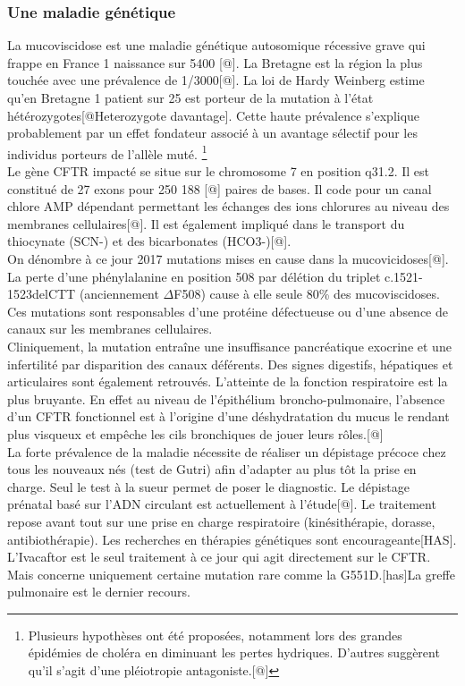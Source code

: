 \documentclass[12pt,a4paper]{article}
\begin{document}
\subsubsection{Une maladie génétique}
La mucoviscidose est une maladie génétique autosomique récessive grave qui frappe en France 1 naissance sur 5400 [@]. La Bretagne est la région la plus touchée avec une prévalence de 1/3000[@].
La loi de Hardy Weinberg estime qu’en Bretagne 1 patient sur 25 est porteur de la mutation à l’état hétérozygotes[@Heterozygote davantage]. Cette haute prévalence s’explique probablement par un effet fondateur associé à un avantage sélectif pour les individus porteurs de l’allèle muté. \footnote{Plusieurs hypothèses ont été proposées, notamment lors des grandes épidémies de choléra en diminuant les pertes hydriques. D’autres suggèrent qu'il s'agit d'une pléiotropie antagoniste.[@]} \\
Le gène CFTR impacté se situe sur le chromosome 7 en position q31.2. Il est constitué de 27 exons pour 250 188 [@] paires de bases. Il code pour un canal chlore AMP dépendant permettant les échanges des ions chlorures au niveau des membranes cellulaires[@]. Il est également impliqué dans le transport du thiocynate (SCN-) et des bicarbonates (HCO3-)[@]. \\
On dénombre à ce jour 2017 mutations mises en cause dans la mucovicidoses[@]. La perte d’une phénylalanine en position 508 par délétion du triplet c.1521-1523delCTT (anciennement $\Delta$F508) cause à elle seule 80\% des mucoviscidoses.
Ces mutations sont responsables d’une protéine défectueuse ou d’une absence de canaux sur les membranes cellulaires. \\
Cliniquement, la mutation entraîne une insuffisance pancréatique exocrine et une infertilité par disparition des canaux déférents. Des signes digestifs, hépatiques et articulaires sont également retrouvés.
L'atteinte de la fonction respiratoire est la plus bruyante. En effet au niveau de l’épithélium broncho-pulmonaire, l’absence d’un CFTR fonctionnel est à l’origine d’une déshydratation du mucus le rendant plus visqueux et empêche les cils bronchiques de jouer leurs rôles.[@]\\
La forte prévalence de la maladie nécessite de réaliser un dépistage précoce chez tous les nouveaux nés (test de Gutri) afin d’adapter au plus tôt la prise en charge. Seul le test à la sueur permet de poser le diagnostic. Le dépistage prénatal basé sur l’ADN circulant est actuellement à l’étude[@]. Le traitement repose avant tout sur une prise en charge respiratoire (kinésithérapie, dorasse, antibiothérapie).
Les recherches en thérapies génétiques sont encourageante[HAS].
L’Ivacaftor est le seul traitement à ce jour qui agit directement sur le CFTR. Mais concerne uniquement certaine mutation rare comme la G551D.[has]La greffe pulmonaire est le dernier recours.
\end{document}
